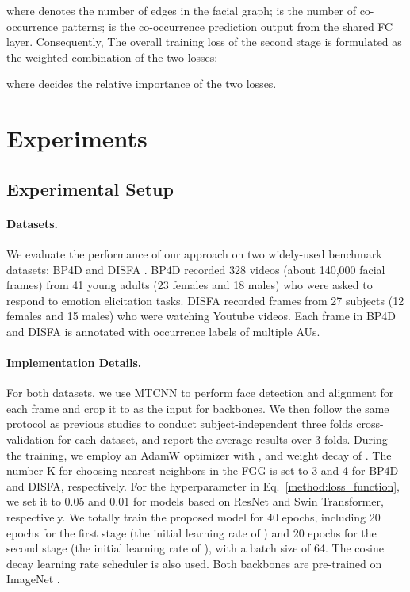\documentclass{article}
\begin{document}
where  denotes the number of edges in the facial graph;  is the number of co-occurrence patterns;  is the co-occurrence prediction output from the shared FC layer. Consequently, The overall training loss of the second stage is formulated as the weighted combination of the two losses:

where  decides the relative importance of the two losses.





\section{Experiments}


\subsection{Experimental Setup}


\paragraph{Datasets.} We evaluate the performance of our approach on two widely-used benchmark datasets: BP4D \cite{zhang2014bp4d} and DISFA \cite{mavadati2013disfa}. BP4D recorded 328 videos (about 140,000 facial frames) from 41 young adults (23 females and 18 males) who were asked to respond to  emotion elicitation tasks. DISFA recorded  frames from 27 subjects (12 females and 15 males) who were watching Youtube videos. Each frame in BP4D and DISFA is annotated with occurrence labels of multiple AUs.





\paragraph{Implementation Details.} 

For both datasets, we use MTCNN \cite{yin2017multi} to perform face detection and alignment for each frame and crop it to  as the input for backbones. We then follow the same protocol as previous studies \cite{zhao2016deep,li2018eac,Song_2021_CVPR} to conduct subject-independent three folds cross-validation for each dataset, and report the average results over 3 folds. During the training, we employ an AdamW optimizer with ,  and weight decay of . The number K for choosing nearest neighbors in the FGG is set to 3 and 4 for BP4D and DISFA, respectively. For the hyperparameter  in Eq.~\ref{method:loss_function}, we set it to 0.05 and 0.01 for models based on ResNet and Swin Transformer, respectively. We totally train the proposed model for 40 epochs, including 20 epochs for the first stage (the initial learning rate of ) and 20 epochs for the second stage (the initial learning rate of ), with a batch size of 64. The cosine decay learning rate scheduler is also used. Both backbones are pre-trained on ImageNet \cite{deng2009imagenet}. 
\end{document}
